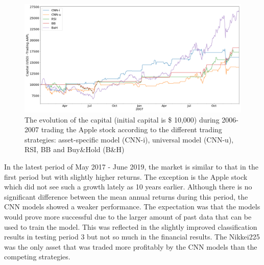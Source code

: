 \documentclass[12pt, a4paper]{article}
\begin{document}
\begin{figure}[H]
    \centering
    \includegraphics[width=\textwidth]{images/capitals/Capitals1_AAPL.png}
    \caption{The evolution of the capital (initial capital is \$ 10,000) during 2006-2007 trading the Apple stock according to the different trading strategies: asset-specific model (CNN-i), universal model (CNN-u), RSI, BB and Buy\&Hold (B\&H)}
    \label{fig:P1_AAPLcapevol}
\end{figure}

In the latest period of May 2017 - June 2019, the market is similar to that in the first period but with slightly higher returns. The exception is the Apple stock which did not see such a growth lately as 10 years earlier. Although there is no significant difference between the mean annual returns during this period, the CNN models showed a weaker performance. The expectation was that the models would prove more successful due to the larger amount of past data that can be used to train the model. 
This was reflected in the slightly improved classification results in testing period 3 but not so much in the financial results. The Nikkei225 was the only asset that was traded more profitably by the CNN models than the competing strategies.
\end{document}
